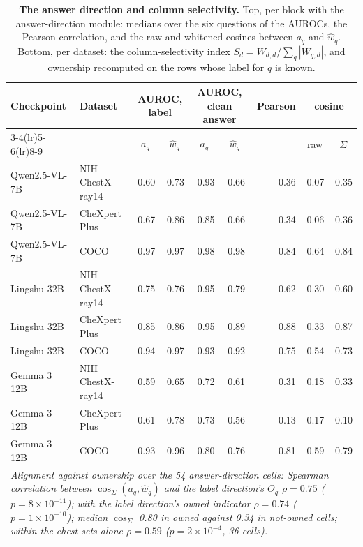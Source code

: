 \begin{table}[h]
\centering
\scriptsize
\setlength{\tabcolsep}{4pt}
\caption{\textbf{The answer direction and column selectivity.} Top, per block with the answer-direction module: medians over the six questions of the AUROCs, the Pearson correlation, and the raw and whitened cosines between $a_q$ and $\hat w_q$. Bottom, per dataset: the column-selectivity index $S_d=W_{d,d}/\sum_q|W_{q,d}|$, and ownership recomputed on the rows whose label for $q$ is known.}
\label{tab:cf-validation}
\begin{tabular}{llrrrrrrr}
\toprule
\multirow{2}{*}{Checkpoint} & \multirow{2}{*}{Dataset} & \multicolumn{2}{c}{AUROC, label} & \multicolumn{2}{c}{AUROC, clean answer} & \multirow{2}{*}{Pearson} & \multicolumn{2}{c}{cosine}\\
\cmidrule(lr){3-4}\cmidrule(lr){5-6}\cmidrule(lr){8-9}
&  & \multicolumn{1}{c}{$a_q$} & \multicolumn{1}{c}{$\hat w_q$} & \multicolumn{1}{c}{$a_q$} & \multicolumn{1}{c}{$\hat w_q$} &  & \multicolumn{1}{c}{raw} & \multicolumn{1}{c}{$\Sigma$}\\
\midrule
Qwen2.5-VL-7B & NIH ChestX-ray14 & 0.60 & 0.73 & 0.93 & 0.66 & 0.36 & 0.07 & 0.35 \\
Qwen2.5-VL-7B & CheXpert Plus & 0.67 & 0.86 & 0.85 & 0.66 & 0.34 & 0.06 & 0.36 \\
Qwen2.5-VL-7B & COCO & 0.97 & 0.97 & 0.98 & 0.98 & 0.84 & 0.64 & 0.84 \\
Lingshu 32B & NIH ChestX-ray14 & 0.75 & 0.76 & 0.95 & 0.79 & 0.62 & 0.30 & 0.60 \\
Lingshu 32B & CheXpert Plus & 0.85 & 0.86 & 0.95 & 0.89 & 0.88 & 0.33 & 0.87 \\
Lingshu 32B & COCO & 0.94 & 0.97 & 0.93 & 0.92 & 0.75 & 0.54 & 0.73 \\
Gemma 3 12B & NIH ChestX-ray14 & 0.59 & 0.65 & 0.72 & 0.61 & 0.31 & 0.18 & 0.33 \\
Gemma 3 12B & CheXpert Plus & 0.61 & 0.78 & 0.73 & 0.56 & 0.13 & 0.17 & 0.10 \\
Gemma 3 12B & COCO & 0.93 & 0.96 & 0.80 & 0.76 & 0.81 & 0.59 & 0.79 \\
\midrule
\multicolumn{9}{p{0.92\linewidth}}{\textit{Alignment against ownership over the 54 answer-direction cells: Spearman correlation between $\cos_\Sigma(a_q,\hat w_q)$ and the label direction's $O_q$ $\rho=0.75$ ($p=8\times10^{-11}$); with the label direction's owned indicator $\rho=0.74$ ($p=1\times10^{-10}$); median $\cos_\Sigma$ 0.80 in owned against 0.34 in not-owned cells; within the chest sets alone $\rho=0.59$ ($p=2\times10^{-4}$, 36 cells).}} \\

\end{tabular}
\end{table}
